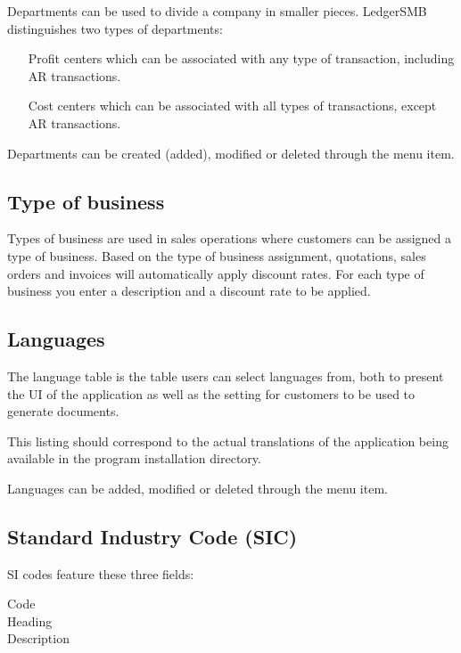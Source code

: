Departments can be used to divide a company in smaller pieces. LedgerSMB distinguishes two
types of departments:

\begin{itemize}
\item [Profit centers] which can be associated with any type of transaction, including AR transactions.
\item [Cost centers] which can be associated with all types of transactions, except AR transactions.
\end{itemize}

Departments can be created (added), modified or deleted through the  menu item.

\subsection{Type of business}
\label{subsec-company-config-business-types}

Types of business are used in sales operations where customers can be assigned a type
of business. Based on the type of business assignment, quotations, sales orders and
invoices will automatically apply discount rates. For each type of business you enter a description and a discount rate to be applied.

\subsection{Languages}
\label{subsec-company-config-languages}

The language table is the table users can select languages from, both to present
the UI of the application as well as the setting for customers to be used to generate
documents.

This listing should correspond to the actual translations of the application being
available in the program installation directory.

Languages can be added, modified or deleted through the  menu item.

\subsection{Standard Industry Code (SIC)}
\label{subsec-company-config-sic}

SI codes feature these three fields:

\begin{description}
\item [Code]
\item [Heading]
\item [Description]
\end{description}

